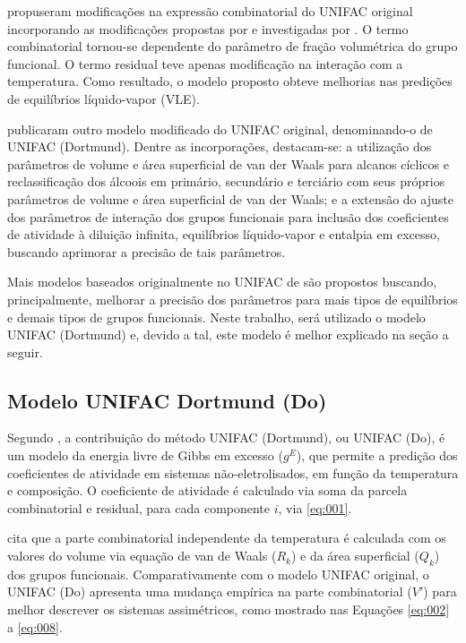  propuseram modificações na expressão 
combinatorial do
UNIFAC original incorporando as modificações propostas por 
 e investigadas por . 
O termo combinatorial tornou-se dependente do parâmetro de 
fração volumétrica do grupo funcional. O termo residual teve 
apenas modificação na interação com a temperatura. Como 
resultado, o modelo proposto obteve melhorias nas predições 
de equilíbrios líquido-vapor (VLE).

 publicaram outro modelo modificado do
UNIFAC original, denominando-o de UNIFAC (Dortmund). Dentre as 
incorporações, destacam-se: a utilização dos parâmetros de 
volume e área superficial de van der Waals para alcanos 
cíclicos e reclassificação dos álcoois em primário, 
secundário e terciário com seus próprios parâmetros de 
volume e área superficial de van der Waals; e a extensão 
do ajuste dos parâmetros de interação dos grupos funcionais 
para inclusão dos coeficientes de atividade à diluição 
infinita, equilíbrios líquido-vapor e entalpia em excesso, 
buscando aprimorar a precisão de tais parâmetros.

Mais modelos baseados originalmente no UNIFAC de  são
propostos buscando, principalmente, melhorar a precisão dos 
parâmetros para mais tipos de equilíbrios e demais tipos de 
grupos funcionais. Neste trabalho, será utilizado o modelo 
UNIFAC (Dortmund) e, devido a tal, este modelo é melhor 
explicado na seção a seguir.

\subsection{Modelo UNIFAC Dortmund (Do)}

Segundo , a contribuição do método 
UNIFAC (Dortmund), ou
UNIFAC (Do), é um modelo da energia livre de Gibbs em 
excesso ($g^E$), que permite a predição dos coeficientes de atividade em
sistemas não-eletrolisados, em função da temperatura e 
composição. O coeficiente de atividade é calculado via 
soma da parcela combinatorial e residual, para cada 
componente $i$, via \autoref{eq:001}.

 cita que a parte combinatorial 
independente da temperatura é
calculada com os valores do volume via equação de van 
de Waals ($R_k$) e da área superficial ($Q_k$) dos grupos funcionais. 
Comparativamente com o modelo UNIFAC original, o UNIFAC (Do)
 apresenta uma mudança empírica na parte combinatorial ($V'$) 
para melhor descrever os sistemas assimétricos, como 
mostrado nas Equações \ref{eq:002} a \ref{eq:008}.


